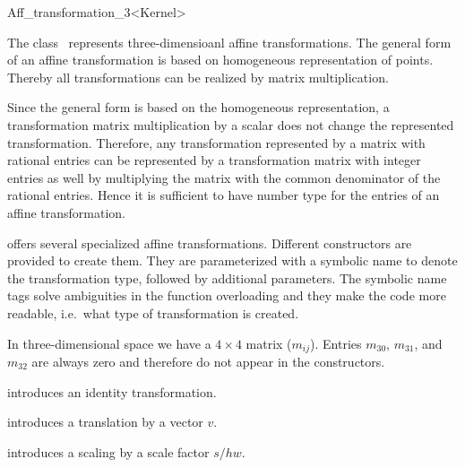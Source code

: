 \begin{ccRefClass}{Aff_transformation_3<Kernel>}

\ccDefinition
The class \ccRefName\ represents three-dimensioanl affine transformations. 
The general form of an affine transformation is based on homogeneous
representation of points. Thereby all transformations can be realized by
matrix multiplication. 

Since the general form is based on the homogeneous representation, a
transformation matrix multiplication by a scalar does not change
the represented transformation. Therefore, any transformation represented
by a matrix with rational entries can be represented by a 
transformation matrix with integer entries as well by multiplying
the matrix with the common denominator of the rational entries. 
Hence it is sufficient to have number type  for the entries 
of an affine transformation.

{\cgal} offers several specialized affine transformations. 
Different constructors are provided to create them. 
They are parameterized with a symbolic name to
denote the transformation type, followed by additional parameters.
The symbolic name tags solve ambiguities in the function
overloading and they make the code more readable, i.e.\ what type
of transformation is created.

In three-dimensional space we have a $4\times 4$ matrix ($m_{ij}$).
Entries $m_{30}$, $m_{31}$, and $m_{32}$ are always zero and 
therefore do not appear in the constructors.

\ccCreation
{}

            {introduces an identity transformation.}


            {introduces a translation by a vector $v$.}
 
            {introduces a scaling by a scale factor $s/hw$.}

\newsavebox{\arrthree}
\newsavebox{\arrlinthree}
\newsavebox{\transvecthree}



\end{ccRefClass}
